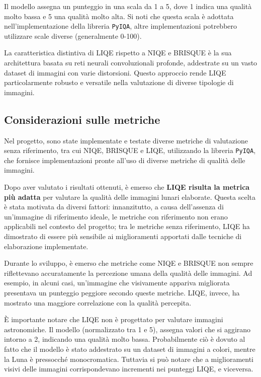 Il modello assegna un punteggio in una scala da 1 a 5, dove 1 indica una qualità molto bassa e 5 una qualità molto alta. Si noti che questa scala è adottata nell'implementazione della libreria \texttt{PyIQA}, altre implementazioni potrebbero utilizzare scale diverse (generalmente 0-100).

La caratteristica distintiva di LIQE rispetto a NIQE e BRISQUE è la sua architettura basata su reti neurali convoluzionali profonde, addestrate su un vasto dataset di immagini con varie distorsioni. Questo approccio rende LIQE particolarmente robusto e versatile nella valutazione di diverse tipologie di immagini.

\subsection{Considerazioni sulle metriche} \label{subsec:why_liqe}

Nel progetto, sono state implementate e testate diverse metriche di valutazione senza riferimento, tra cui NIQE, BRISQUE e LIQE, utilizzando la libreria \texttt{PyIQA}, che fornisce implementazioni pronte all'uso di diverse metriche di qualità delle immagini.

Dopo aver valutato i risultati ottenuti, è emerso che \textbf{LIQE risulta la metrica più adatta} per valutare la qualità delle immagini lunari elaborate. Questa scelta è stata motivata da diversi fattori: innanzitutto, a causa dell'assenza di un'immagine di riferimento ideale, le metriche con riferimento non erano applicabili nel contesto del progetto; tra le metriche senza riferimento, LIQE ha dimostrato di essere più sensibile ai miglioramenti apportati dalle tecniche di elaborazione implementate.

Durante lo sviluppo, è emerso che metriche come NIQE e BRISQUE non sempre riflettevano accuratamente la percezione umana della qualità delle immagini. Ad esempio, in alcuni casi, un'immagine che visivamente appariva migliorata presentava un punteggio peggiore secondo queste metriche. LIQE, invece, ha mostrato una maggiore correlazione con la qualità percepita.

È importante notare che LIQE non è progettato per valutare immagini astronomiche. Il modello (normalizzato tra 1 e 5), assegna valori che si aggirano intorno a 2, indicando una qualità molto bassa. Probabilmente ciò è dovuto al fatto che il modello è stato addestrato su un dataset di immagini a colori, mentre la Luna è pressocché monocromatica. Tuttavia si può notare che a miglioramenti visivi delle immagini corrispondevano incrementi nei punteggi LIQE, e viceversa.

